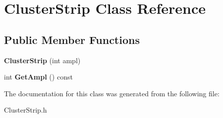\hypertarget{class_cluster_strip}{}\section{Cluster\+Strip Class Reference}
\label{class_cluster_strip}
\subsection*{Public Member Functions}
\begin{DoxyCompactItemize}
\item 
\mbox{\label{class_cluster_strip_a9bdb519cc20d26f4b3754d9179dd0110}} 
{\bfseries Cluster\+Strip} (int ampl)
\item 
\mbox{\label{class_cluster_strip_a0b4f7b2c7d95836a04822dacbfd33770}} 
int {\bfseries Get\+Ampl} () const
\end{DoxyCompactItemize}


The documentation for this class was generated from the following file\+:\begin{DoxyCompactItemize}
\item 
Cluster\+Strip.\+h\end{DoxyCompactItemize}
